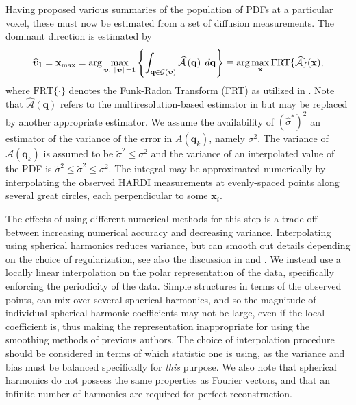 \documentclass[dvips,aoas,preprint]{imsart}
\numberwithin{equation}{section}
\theoremstyle{plain}
\newcommand{\q}{\mathbf{q}}
\newcommand{\bu}{\bs{\upsilon}}
\newcommand{\x}{\mathbf{x}}
\newcommand{\cA}{\mathcal{A}}
\newcommand{\bs}[1]{\boldsymbol{#1}}
\newcommand{\wh}[1]{\widehat{#1}}
\begin{document}
Having proposed various summaries of the population of PDFs at a
particular voxel, these must now be estimated from a set of diffusion
measurements.  The dominant direction is estimated by
\begin{equation}
\label{eq:lala}
\widehat{\bu}_\text{1}= \x_\text{max}=\arg \max_{ \bu,\;\|\bu\|=1}\left\{
\int_{\q\in {\cal G}(\bu)}\widehat{\cA}\left(\q\right)\;d\q
\right\}\equiv \arg \max_{\x} \text{FRT}\{\wh\cA\}(\x),
\end{equation}
where $\text{FRT}\{\cdot\}$ denotes the Funk-Radon Transform (FRT) as
utilized in \citet{Tuch}.  Note that $\wh\cA(\q)$ refers to the
multiresolution-based estimator in \citet{OlhedeWhitcher} but may be
replaced by another appropriate estimator.  We assume the availability
of $(\wh{\sigma}^{\ast})^2$ an estimator of the variance of the error
in $A(\q_k)$, namely $\sigma^2$.  The variance of $\wh\cA(\q_k)$ is
assumed to be $\tilde{\sigma}^2\le \sigma^2$ and the variance of an
interpolated value of the PDF is
$\breve{\sigma}^2\le\tilde{\sigma}^2\le \sigma^2$.  The integral may
be approximated numerically by interpolating the observed HARDI
measurements at evenly-spaced points along several great circles, each
perpendicular to some $\x_i$.  

The effects of using different numerical methods for this step is a
trade-off between increasing numerical accuracy and decreasing
variance.  Interpolating using spherical harmonics reduces variance,
but can smooth out details depending on the choice of regularization,
see also the discussion in \citet{Descoteaux} and \citet{Hess}.  We
instead use a locally linear interpolation on the polar representation
of the data, specifically enforcing the periodicity of the data.
Simple structures in terms of the observed points, can mix over
several spherical harmonics, and so the magnitude of individual
spherical harmonic coefficients may not be large, even if the local
coefficient is, thus making the representation inappropriate for using
the smoothing methods of previous authors.  The choice of
interpolation procedure should be considered in terms of which
statistic one is using, as the variance and bias must be balanced
specifically for {\em this} purpose.  We also note that spherical
harmonics do not possess the same properties as Fourier vectors, and
that an infinite number of harmonics are required for perfect
reconstruction.
\end{document}
